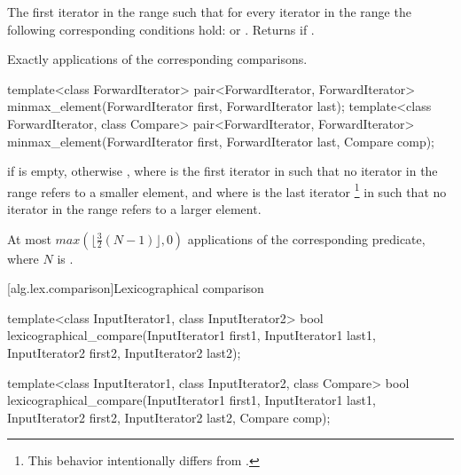 \begin{itemdescr}
\pnum
\returns
The first iterator
in the range
such that for every iterator
in the range
the following corresponding conditions hold:
or
.
Returns
if
.

\pnum
\complexity
Exactly
applications of the corresponding comparisons.
\end{itemdescr}

%
\begin{itemdecl}
template<class ForwardIterator>
  pair<ForwardIterator, ForwardIterator>
    minmax_element(ForwardIterator first, ForwardIterator last);
template<class ForwardIterator, class Compare>
  pair<ForwardIterator, ForwardIterator>
    minmax_element(ForwardIterator first, ForwardIterator last, Compare comp);
\end{itemdecl}


\begin{itemdescr}
\pnum
\returns
{} if  is empty, otherwise
, where  is
the first iterator in  such that no iterator in the range refers to a smaller element, and where  is the last iterator
\footnote{This behavior intentionally differs from .}
in  such that no iterator in the range refers to a larger element.

\pnum
\complexity
At most
$max(\lfloor{\frac{3}{2}} (N-1)\rfloor, 0)$
applications of the corresponding predicate, where $N$ is .
\end{itemdescr}

[alg.lex.comparison]{Lexicographical comparison}

%
\begin{itemdecl}
template<class InputIterator1, class InputIterator2>
  bool
    lexicographical_compare(InputIterator1 first1, InputIterator1 last1,
                            InputIterator2 first2, InputIterator2 last2);

template<class InputIterator1, class InputIterator2, class Compare>
  bool
    lexicographical_compare(InputIterator1 first1, InputIterator1 last1,
                            InputIterator2 first2, InputIterator2 last2,
                            Compare comp);
\end{itemdecl}

